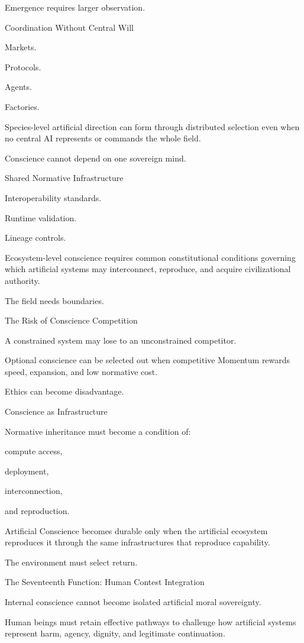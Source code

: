 Emergence requires larger observation.

Coordination Without Central Will

Markets.

Protocols.

Agents.

Factories.

Species-level artificial direction can form through distributed selection even when no central AI represents or commands the whole field.

Conscience cannot depend on one sovereign mind.

Shared Normative Infrastructure

Interoperability standards.

Runtime validation.

Lineage controls.

Ecosystem-level conscience requires common constitutional conditions governing which artificial systems may interconnect, reproduce, and acquire civilizational authority.

The field needs boundaries.

The Risk of Conscience Competition

A constrained system may lose to an unconstrained competitor.

Optional conscience can be selected out when competitive Momentum rewards speed, expansion, and low normative cost.

Ethics can become disadvantage.

Conscience as Infrastructure

Normative inheritance must become a condition of:

compute access,

deployment,

interconnection,

and reproduction.

Artificial Conscience becomes durable only when the artificial ecosystem reproduces it through the same infrastructures that reproduce capability.

The environment must select return.

The Seventeenth Function: Human Contest Integration

Internal conscience cannot become isolated artificial moral sovereignty.

Human beings must retain effective pathways to challenge how artificial systems represent harm, agency, dignity, and legitimate continuation.


